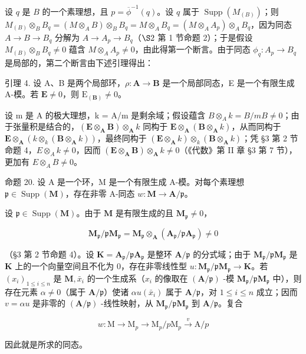 设 \(q\) 是 \(B\) 的一个素理想，且 \(p = \overline{\phi}^{-1}(q)\)。设 \(q\) 属于 \(\operatorname{Supp}(M_{(B)})\)；则 \(M_{(B)} \otimes_B B_q = (M \otimes_A B) \otimes_B B_q = M \otimes_A B_q = (M \otimes_A A_p) \otimes_A B_q\)，因为同态 \(A \to B \to B_q\) 分解为 \(A \to A_p \to B_q\)（\(\S 2\) 第 1 节命题 2）；于是假设 \(M_{(B)} \otimes_B B_q \neq 0\) 蕴含 \(M \otimes_A A_p \neq 0\)，由此得第一个断言。由于同态 \(\phi_q: A_p \to B_q\) 是局部的，第二个断言由下述引理得出：

引理 4. 设 A、B 是两个局部环，\(\rho: \mathbf{A} \to \mathbf{B}\) 是一个局部同态，E 是一个有限生成 A-模。若 \(\mathbf{E} \neq 0\)，则 \(\mathrm{E}_{(\mathbf{B})} \neq 0\)。

设 m 是 A 的极大理想，k = A/m 是剩余域；假设蕴含 \(B \otimes_{A} k = B/mB \neq 0\)；由于张量积是结合的，\((\mathbf{E} \otimes_{\mathbf{A}} \mathbf{B}) \otimes_{\mathbf{A}} k\) 同构于 \(\mathbf{E} \otimes_{\mathbf{A}} (\mathbf{B} \otimes_{\mathbf{A}} k)\)，从而同构于 \(\mathbf{E} \otimes_{\mathbf{A}} (k \otimes_{k} (\mathbf{B} \otimes_{\mathbf{A}} k))\)，最终同构于 \((\mathbf{E} \otimes_{\mathbf{A}} k) \otimes_{k} (\mathbf{B} \otimes_{\mathbf{A}} k)\)；凭 §3 第 2 节命题 4，\(E \otimes_{A} k \neq 0\)，因而 \((\mathbf{E} \otimes_{\mathbf{A}} \mathbf{B}) \otimes_{\mathbf{A}} k \neq 0\)（《代数》第 II 章 §3 第 7 节），更加有 \(E \otimes_{A} B \neq 0\)。

命题 20. 设 A 是一个环，M 是一个有限生成 A-模。对每个素理想 \(\mathfrak{p} \in \operatorname{Supp}(\mathbf{M})\)，存在非零 A-同态 \(w: \mathbf{M} \to \mathbf{A}/\mathfrak{p}\)。

设 \(\mathfrak{p} \in \operatorname{Supp}(\mathbf{M})\)。由于 \(\mathbf{M}\) 是有限生成的且 \(\mathbf{M}_{\mathfrak{p}} \neq 0\)，

\[
\mathbf {M} _ {\mathfrak {p}} / \mathfrak {p} \mathbf {M} _ {\mathfrak {p}} = \mathbf {M} _ {\mathfrak {p}} \otimes_ {\mathbf {A}} (\mathbf {A} _ {\mathfrak {p}} / \mathfrak {p} \mathbf {A} _ {\mathfrak {p}}) \neq 0
\]

（§3 第 2 节命题 4）。设 \(\mathbf{K} = \mathbf{A}_{\mathfrak{p}} / \mathfrak{p}\mathbf{A}_{\mathfrak{p}}\) 是整环 \(\mathbf{A} / \mathfrak{p}\) 的分式域；由于 \(\mathbf{M}_{\mathfrak{p}} / \mathfrak{p}\mathbf{M}_{\mathfrak{p}}\) 是 \(\mathbf{K}\) 上的一个向量空间且不化为 0，存在非零线性型 \(u: \mathbf{M}_{\mathfrak{p}} / \mathfrak{p}\mathbf{M}_{\mathfrak{p}} \to \mathbf{K}\)。若 \((x_{i})_{1 \leqslant i \leqslant n}\) 是 \(\mathbf{M}, \bar{x}_{i}\) 的一个生成系（\(x_{i}\) 的像取在 \((\mathbf{A} / \mathfrak{p})\) -模 \(\mathbf{M}_{\mathfrak{p}} / \mathfrak{p}\mathbf{M}_{\mathfrak{p}}\) 中），则存在元素 \(\alpha \neq 0\)（属于 \(\mathbf{A} / \mathfrak{p}\)）使诸 \(\alpha u(\bar{x}_i)\) 属于 \(\mathbf{A} / \mathfrak{p}\)，对 \(1 \leqslant i \leqslant n\) 成立；因而 \(v = \alpha u\) 是非零的 \((\mathbf{A} / \mathfrak{p})\) -线性映射，从 \(\mathbf{M}_{\mathfrak{p}} / \mathfrak{p}\mathbf{M}_{\mathfrak{p}}\) 到 \(\mathbf{A} / \mathfrak{p}\)。复合

\[
w: \mathrm{M} \longrightarrow \mathrm{M} _ {p} \longrightarrow \mathrm{M} _ {p} / p \mathrm{M} _ {p} \stackrel {v} {\longrightarrow} \mathrm{A} / p
\]

因此就是所求的同态。


